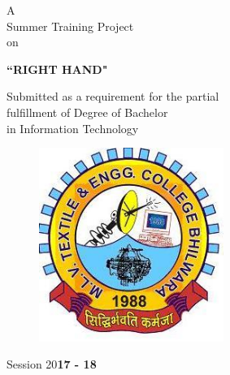\documentclass[twoside,a4paper,16pt]{book}
\begin{document}


\frontmatter
\thispagestyle{empty}




\begin{center}
{\Large A \\ Summer Training Project\\ on \\
\vspace{0.5cm}

{\bf ``RIGHT HAND"}}
\end{center}

\vspace{0.3cm}
\begin{center}
 \Large Submitted as a requirement for the partial \\fulfillment of Degree of  Bachelor \\ in Information Technology
\end{center}
\vspace{0.6cm}

\begin{figure}[ht!]
\begin{center}
\includegraphics[width=6.0cm]{logo.jpg}
\end{center}
\end{figure}

 \vspace{0.2cm}

\begin{center}
\Large Session 20\bf{17} - \bf{18}
\end{center}

\vspace{1.0cm}
\end{document}
